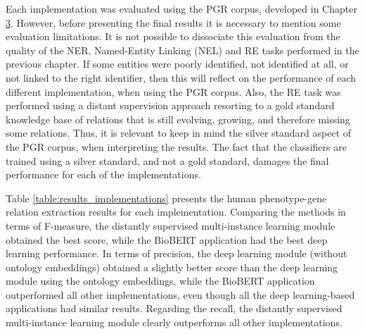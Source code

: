 Each implementation was evaluated using the PGR corpus, developed in Chapter \hyperlink{3}{3}. However, before presenting the final results it is necessary to mention some evaluation limitations. It is not possible to dissociate this evaluation from the quality of the NER, Named-Entity Linking (NEL) and RE tasks performed in the previous chapter. If some entities were poorly identified, not identified at all, or not linked to the right identifier, then this will reflect on the performance of each different implementation, when using the PGR corpus. Also, the RE task was performed using a distant supervision approach resorting to a gold standard knowledge base of relations that is still evolving, growing, and therefore missing some relations. Thus, it is relevant to keep in mind the silver standard aspect of the PGR corpus, when interpreting the results. The fact that the classifiers are trained using a silver standard, and not a gold standard, damages the final performance for each of the implementations.

Table \ref{table:results_implementations} presents the human phenotype-gene relation extraction results for each implementation. Comparing the methods in terms of F-measure, the distantly supervised multi-instance learning module obtained the best score, while the BioBERT application had the best deep learning performance. In terms of precision, the deep learning module (without ontology embeddings) obtained a slightly better score than the deep learning module using the ontology embeddings, while the BioBERT application outperformed all other implementations, even though all the deep learning-based applications had similar results. Regarding the recall, the distantly supervised multi-instance learning module clearly outperforms all other implementations.

